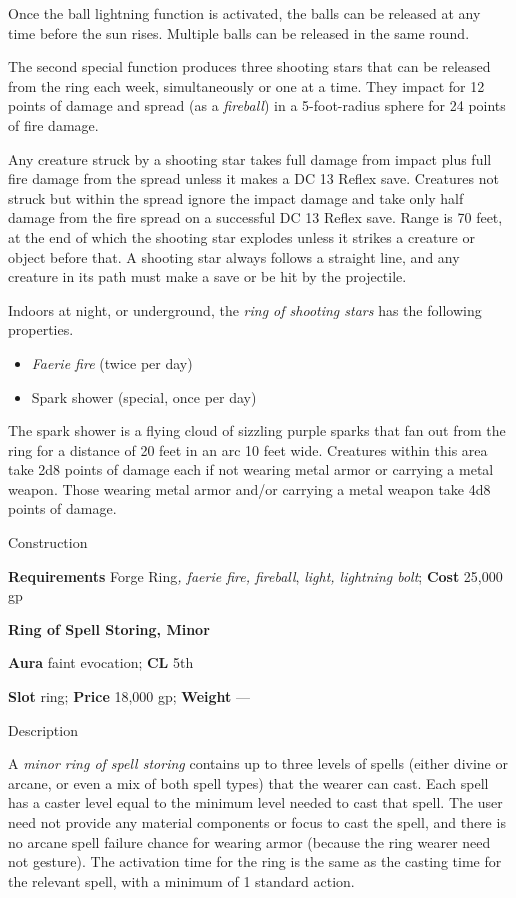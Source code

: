 				
Once the ball lightning function is activated, the balls can be released at any time before the sun rises. Multiple balls can be released in the same round.
				
The second special function produces three shooting stars that can be released from the ring each week, simultaneously or one at a time. They impact for 12 points of damage and spread (as a \textit{fireball}) in a 5-foot-radius sphere for 24 points of fire damage.
				
Any creature struck by a shooting star takes full damage from impact plus full fire damage from the spread unless it makes a DC 13 Reflex save. Creatures not struck but within the spread ignore the impact damage and take only half damage from the fire spread on a successful DC 13 Reflex save. Range is 70 feet, at the end of which the shooting star explodes unless it strikes a creature or object before that. A shooting star always follows a straight line, and any creature in its path must make a save or be hit by the projectile.
				
Indoors at night, or underground, the \textit{ring of shooting stars }has the following properties.
				\begin{itemize}\item  \textit{Faerie fire} (twice per day)
				\item  Spark shower (special, once per day)
\end{itemize}
				
The spark shower is a flying cloud of sizzling purple sparks that fan out from the ring for a distance of 20 feet in an arc 10 feet wide. Creatures within this area take 2d8 points of damage each if not wearing metal armor or carrying a metal weapon. Those wearing metal armor and/or carrying a metal weapon take 4d8 points of damage. 
				
Construction
				
\textbf{Requirements} Forge Ring\textit{, faerie fire, fireball}, \textit{light, lightning bolt}; \textbf{Cost }25,000 gp
				
\textbf{Ring of Spell Storing, Minor}
				
\textbf{Aura} faint evocation;\textbf{ CL }5th
				
\textbf{Slot} ring; \textbf{Price} 18,000 gp; \textbf{Weight} ---
				
Description
				
A \textit{minor ring of spell storing }contains up to three levels of spells (either divine or arcane, or even a mix of both spell types) that the wearer can cast. Each spell has a caster level equal to the minimum level needed to cast that spell. The user need not provide any material components or focus to cast the spell, and there is no arcane spell failure chance for wearing armor (because the ring wearer need not gesture). The activation time for the ring is the same as the casting time for the relevant spell, with a minimum of 1 standard action.
				
